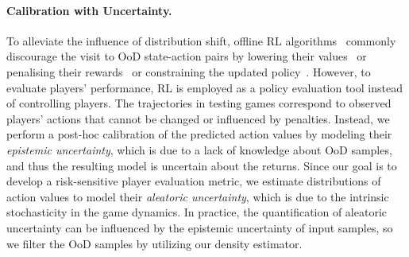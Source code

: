 \documentclass[letterpaper]{article} %
\begin{document}
\paragraph{Calibration with Uncertainty.}
To alleviate the influence of distribution shift, offline RL algorithms~\cite{Levine2020OfflineRL} commonly discourage the visit to OoD state-action pairs by lowering their values~\cite{Kumar2020CQL} or penalising their rewards~\cite{Yu2020MOPO} or constraining the updated policy~\cite{Fujimoto2019OffPolicy,Kumar2019Stable}. However, to evaluate players' performance, RL is employed as a policy evaluation tool instead of controlling players. The trajectories in testing games correspond to observed players' actions that cannot be changed or influenced by penalties. Instead, we perform a post-hoc calibration of the predicted action values by modeling their {\it epistemic uncertainty}, which is due to a lack of knowledge about OoD samples, and thus the resulting model is uncertain about the returns. Since our goal is to develop a risk-sensitive player evaluation metric, we estimate distributions of action values to model their {\it aleatoric uncertainty}, which is due to the intrinsic stochasticity in the game dynamics.
In practice, the quantification of aleatoric uncertainty can be influenced by the epistemic uncertainty of input samples, so we filter the OoD samples by utilizing our density estimator.
\end{document}
